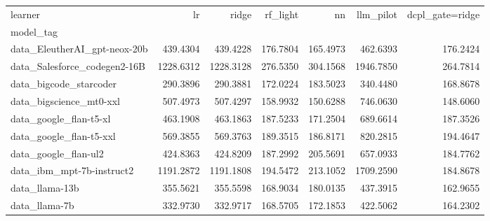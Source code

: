 \begin{tabular}{lrrrrrr}
\toprule
learner & lr & ridge & rf\_light & nn & llm\_pilot & dcpl\_gate=ridge \\
model_tag &  &  &  &  &  &  \\
\midrule
data\_EleutherAI\_gpt-neox-20b & 439.4304 & 439.4228 & 176.7804 & 165.4973 & 462.6393 & 176.2424 \\
data\_Salesforce\_codegen2-16B & 1228.6312 & 1228.3128 & 276.5350 & 304.1568 & 1946.7850 & 264.7814 \\
data\_bigcode\_starcoder & 290.3896 & 290.3881 & 172.0224 & 183.5023 & 340.4480 & 168.8678 \\
data\_bigscience\_mt0-xxl & 507.4973 & 507.4297 & 158.9932 & 150.6288 & 746.0630 & 148.6060 \\
data\_google\_flan-t5-xl & 463.1908 & 463.1863 & 187.5233 & 171.2504 & 689.6614 & 187.3526 \\
data\_google\_flan-t5-xxl & 569.3855 & 569.3763 & 189.3515 & 186.8171 & 820.2815 & 194.4647 \\
data\_google\_flan-ul2 & 424.8363 & 424.8209 & 187.2992 & 205.5691 & 657.0933 & 184.7762 \\
data\_ibm\_mpt-7b-instruct2 & 1191.2872 & 1191.1808 & 194.5472 & 213.1052 & 1709.2590 & 184.8678 \\
data\_llama-13b & 355.5621 & 355.5598 & 168.9034 & 180.0135 & 437.3915 & 162.9655 \\
data\_llama-7b & 332.9730 & 332.9717 & 168.5705 & 172.1853 & 422.5062 & 164.2302 \\
\bottomrule
\end{tabular}
